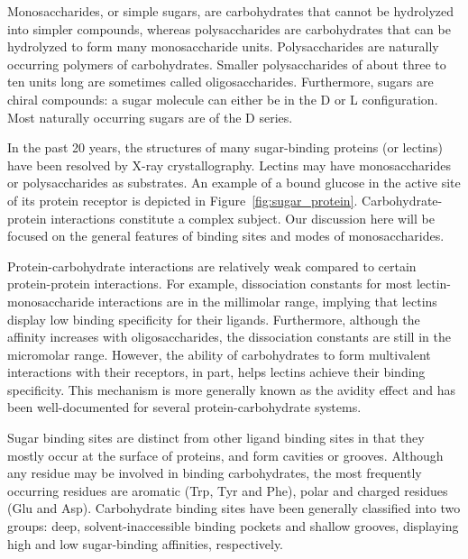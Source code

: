 Monosaccharides, or simple sugars, are carbohydrates that cannot be hydrolyzed into simpler compounds, whereas polysaccharides are carbohydrates that can be hydrolyzed to form many monosaccharide units. Polysaccharides are naturally occurring polymers of carbohydrates. Smaller polysaccharides of about three to ten units long are sometimes called oligosaccharides.  Furthermore, sugars are chiral compounds: a sugar molecule can either be in the D or L configuration. Most naturally occurring sugars are of the D series.

In the past 20 years, the structures of many sugar-binding proteins (or lectins) have been resolved by X-ray crystallography.\cite{Rini:1995p2497} Lectins may have monosaccharides or polysaccharides as substrates. An example of a bound glucose in the active site of its protein receptor is depicted in Figure~\ref{fig:sugar_protein}. Carbohydrate-protein interactions constitute a complex subject. Our discussion here will be focused on the general features of binding sites and modes of monosaccharides. 

Protein-carbohydrate interactions are relatively weak compared to certain protein-protein interactions. For example, dissociation constants for most lectin-monosaccharide interactions are in the millimolar range, implying that lectins display low binding specificity for their ligands. Furthermore, although the affinity increases with oligosaccharides, the dissociation constants are still in the micromolar range.  However, the ability of carbohydrates to form multivalent interactions with their receptors, in part, helps lectins achieve their binding specificity.  This mechanism is more generally known as the avidity effect and has been well-documented for several protein-carbohydrate systems.\cite{Rini:1995p2497}

Sugar binding sites are distinct from other ligand binding sites in that they mostly occur at the surface of proteins, and form cavities or grooves. Although any residue may be involved in binding carbohydrates, the most frequently occurring residues are aromatic (Trp, Tyr and Phe), polar and charged residues (Glu and Asp).\cite{Vyas:1991p6498} Carbohydrate binding sites have been generally classified into two groups: deep, solvent-inaccessible binding pockets and shallow grooves, displaying high and low sugar-binding affinities, respectively.\cite{Vyas:1991p6498,Rini:1995p2497}

